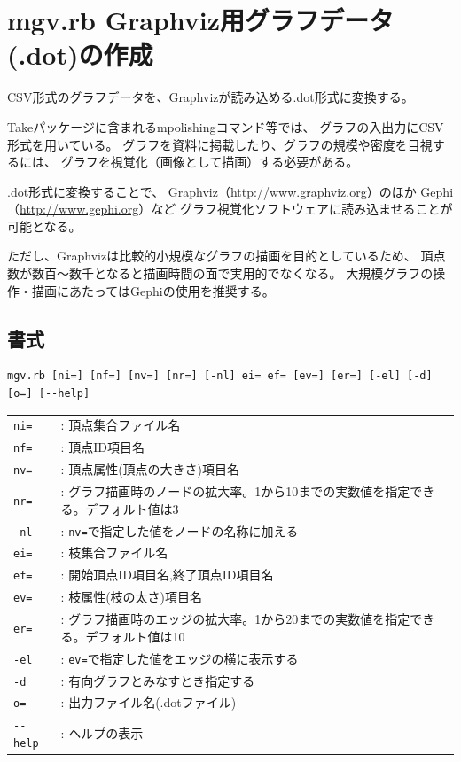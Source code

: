 



\section{mgv.rb Graphviz用グラフデータ(.dot)の作成\label{sect:mgv}}

CSV形式のグラフデータを、Graphvizが読み込める.dot形式に変換する。

Takeパッケージに含まれるmpolishingコマンド等では、
グラフの入出力にCSV形式を用いている。
グラフを資料に掲載したり、グラフの規模や密度を目視するには、
グラフを視覚化（画像として描画）する必要がある。

.dot形式に変換することで、
Graphviz（\url{http://www.graphviz.org}）のほか
Gephi（\url{http://www.gephi.org}）など
グラフ視覚化ソフトウェアに読み込ませることが可能となる。

ただし、Graphvizは比較的小規模なグラフの描画を目的としているため、
頂点数が数百〜数千となると描画時間の面で実用的でなくなる。
大規模グラフの操作・描画にあたってはGephiの使用を推奨する。

\subsection{書式}
\begin{verbatim}
mgv.rb [ni=] [nf=] [nv=] [nr=] [-nl] ei= ef= [ev=] [er=] [-el] [-d] [o=] [--help]
\end{verbatim}

\begin{table}[htbp]
{\small
\begin{tabular}{ll}
\verb|ni=| & : 頂点集合ファイル名 \\
\verb|nf=| & : 頂点ID項目名 \\
\verb|nv=| & : 頂点属性(頂点の大きさ)項目名 \\
\verb|nr=| & : グラフ描画時のノードの拡大率。1から10までの実数値を指定できる。デフォルト値は3 \\
\verb|-nl| & : \verb|nv=|で指定した値をノードの名称に加える \\
\verb|ei=| & : 枝集合ファイル名 \\
\verb|ef=| & : 開始頂点ID項目名,終了頂点ID項目名 \\
\verb|ev=| & : 枝属性(枝の太さ)項目名 \\
\verb|er=| & : グラフ描画時のエッジの拡大率。1から20までの実数値を指定できる。デフォルト値は10 \\
\verb|-el| & : \verb|ev=|で指定した値をエッジの横に表示する \\
\verb|-d|  & : 有向グラフとみなすとき指定する \\
\verb|o=|  & : 出力ファイル名(.dotファイル) \\
\verb|--help| & : ヘルプの表示 \\
\end{tabular} 
}
\end{table} 

